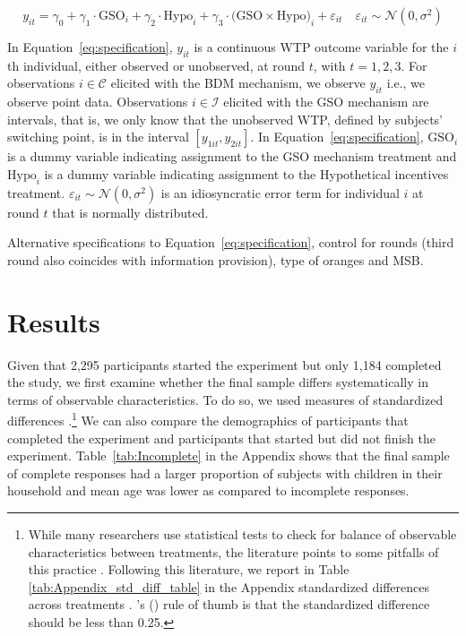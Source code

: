 \documentclass[12pt]{article}
\newcommand\citeapos[1]{\citeauthor{#1}'s (\citeyear{#1})} %
\begin{document}
\begin{equation}\label{eq:specification}
y_{it} = \gamma_0 + \gamma_1 \cdot \text{GSO}_i + \gamma_2 \cdot \text{Hypo}_i + \gamma_3 \cdot \text{(GSO} \times \text{Hypo)}_i +  \varepsilon_{it} 
\quad \varepsilon_{it} \sim \mathcal{N}(0, \sigma^2)
\end{equation}


In Equation~\ref{eq:specification}, $y_{it}$ is a continuous WTP outcome variable for the $i$th individual, either observed or unobserved, at round $t$, with $t = 1, 2, 3$. For observations $i \in \mathcal{C}$ elicited with the BDM mechanism, we observe $y_{it}$ i.e., we observe point data. Observations $i\in \mathcal{I}$ elicited with the GSO mechanism are intervals, that is, we only know that the unobserved WTP, defined by subjects' switching point, is in the interval $[y_{1it}, y_{2it}]$. In Equation~\ref{eq:specification}, $\text{GSO}_i$ is a dummy variable indicating assignment to the GSO mechanism treatment and $\text{Hypo}_i$ is a dummy variable indicating assignment to the Hypothetical incentives treatment. $\varepsilon_{it} \sim \mathcal{N}(0, \sigma^2)$ is an idiosyncratic error term for individual $i$ at round $t$ that is normally distributed.

Alternative specifications to Equation~\ref{eq:specification}, control for rounds (third round also coincides with information provision), type of oranges and MSB.

\section{Results}
\label{Results}

Given that 2,295 participants started the experiment but only 1,184 completed the study, we first examine whether the final sample differs systematically in terms of observable characteristics. To do so, we used measures of standardized differences \citep{CochranRubin1973}.\footnote{While many researchers use statistical tests to check for balance of observable characteristics between treatments, the literature points to some pitfalls of this practice \citep[e.g.,][]{canavari2019run,DeatonCartwright2016,BrizEtAl2017,HoEtAl2007,MoherEtAl2010,MutzPemantle2015}. Following this literature, we report in Table \ref{tab:Appendix_std_diff_table} in the Appendix standardized differences across treatments \citep{ImbensRubin2016,ImbensWooldridge2009}. \citeapos{CochranRubin1973} rule of thumb is that the standardized difference should be less than 0.25.}  We can also compare the demographics of participants that completed the experiment and participants that started but did not finish the experiment. Table~\ref{tab:Incomplete} in the Appendix shows that the final sample of complete responses had a larger proportion of subjects with children in their household and mean age was lower as compared to incomplete responses.
\end{document}
